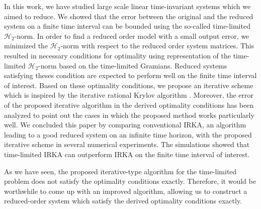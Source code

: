 \documentclass[a4paper,11pt, twoside]{article}
\begin{document}
In this work, we have studied large scale linear time-invariant systems which we aimed to reduce. We showed that the error between the original 
and the reduced system on a finite time interval can be bounded using the so-called time-limited $\mathcal H_2$-norm. In order to find a reduced 
order model with a small output error, we minimized the $\mathcal H_2$-norm with respect to the reduced order system matrices. This resulted in 
necessary conditions for optimality using representation of the time-limited $\mathcal H_2$-norm based on the time-limited Gramians. Reduced systems 
satisfying theses condition are expected to perform well on the finite time interval of interest. Based on these optimality conditions, we propose an 
iterative scheme which is inspired by the iterative rational Krylov algorithm \cite{morGugAB08}. Moreover, the error of the proposed iterative 
algorithm in the derived optimality conditions has been analyzed to point out the cases in which the proposed method works 
particularly well. We concluded this paper by comparing conventional IRKA, an algorithm leading to a good reduced system on an infinite time 
horizon, with the proposed iterative scheme in several numerical experiments. The simulations showed that time-limited IRKA can outperform IRKA on the 
finite time interval of interest.

As we have seen, the proposed iterative-type algorithm for the time-limited problem does not satisfy the optimality conditions exactly. Therefore, it 
would be worthwhile to come up with an improved algorithm, allowing us to construct a reduced-order system which satisfy the derived optimality 
conditions exactly. 
\end{document}

